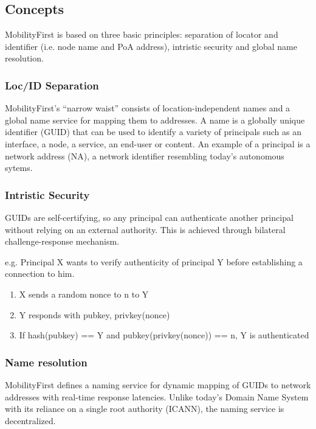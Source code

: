         \subsection{Concepts}

            MobilityFirst is based on three basic principles: separation of locator and identifier (i.e. node name and PoA address), intristic security and global name resolution.

            \subsubsection{Loc/ID Separation}

                MobilityFirst's ``narrow waist'' consists of location-independent names and a global name service for mapping them to addresses. A name is a globally unique identifier (GUID) that can be used to identify a variety of principals such as an interface, a node, a service, an end-user or content. An example of a principal is a network address (NA), a network identifier resembling today's autonomous sytems.

            \subsubsection{Intristic Security}

                GUIDs are self-certifying, so any principal can authenticate another principal without relying on an external authority. This is achieved through bilateral challenge-response mechanism.

                e.g. Principal X wants to verify authenticity of principal Y before establishing a connection to him.
                \begin{enumerate}
                    \item X sends a random nonce to n to Y
                    \item Y responds with {pubkey, privkey(nonce)}
                    \item If hash(pubkey) == Y and pubkey(privkey(nonce)) == n, Y is authenticated
                \end{enumerate}

            \subsubsection{Name resolution}

                MobilityFirst defines a naming service for dynamic mapping of GUIDs to network addresses with real-time response latencies. Unlike today's Domain Name System with its reliance on a single root authority (ICANN), the naming service is decentralized.

